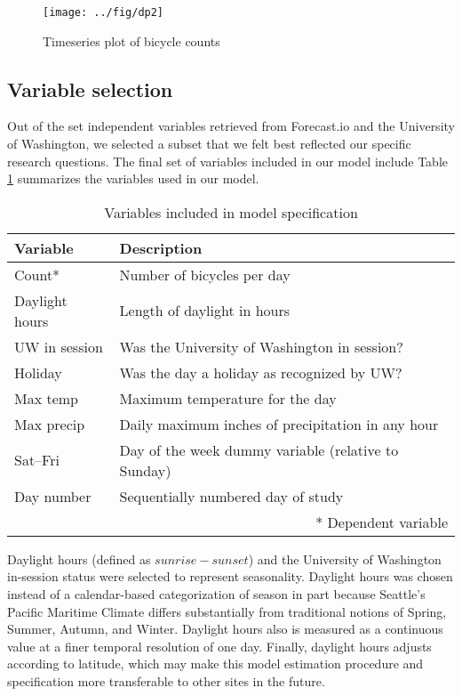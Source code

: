 \documentclass[12pt,letterpaper,article]{memoir} %
\begin{document}
\begin{figure}[h!]
  \centering
  \texttt{[image: ../fig/dp2]}
  \caption{Timeseries plot of bicycle counts}
  \label{fg:timeseries}
\end{figure}


\subsection*{Variable selection}
% 
% 

Out of the set independent variables retrieved from Forecast.io and
the University of Washington, we selected a subset that we felt best
reflected our specific research questions. The final set of variables
included in our model include Table \ref{tb:variables} summarizes the
variables used in our model.

\begin{centering}
\begin{table}[h]
\caption{Variables included in model specification}
\begin{tabular}{ll}
\toprule
Variable & Description \\
\midrule
Count* & Number of bicycles per day \\
Daylight hours & Length of daylight in hours \\
UW in session & Was the University of Washington in session? \\
Holiday & Was the day a holiday as recognized by UW? \\
Max temp & Maximum temperature for the day \\
Max precip & Daily maximum inches of precipitation in any hour \\
Sat--Fri & Day of the week dummy variable (relative to Sunday) \\
Day number & Sequentially numbered day of study \\
\bottomrule
\multicolumn{2}{r}{* Dependent variable}
\end{tabular}

\label{tb:variables}
\end{table}
\end{centering}

Daylight hours (defined as $sunrise - sunset$) and the University of
Washington in-session status were selected to represent seasonality.
Daylight hours was chosen instead of a calendar-based categorization
of season in part because Seattle's Pacific Maritime Climate differs
substantially from traditional notions of Spring, Summer, Autumn, and
Winter. Daylight hours also is measured as a continuous value at a
finer temporal resolution of one day. Finally, daylight hours adjusts
according to latitude, which may make this model estimation procedure
and specification more transferable to other sites in the future.
\end{document}
